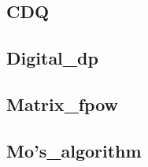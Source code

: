     \subsection{CDQ}
        
    \subsection{Digital\_dp}
        
    \subsection{Matrix\_fpow}
        
    \subsection{Mo's\_algorithm}
        
    